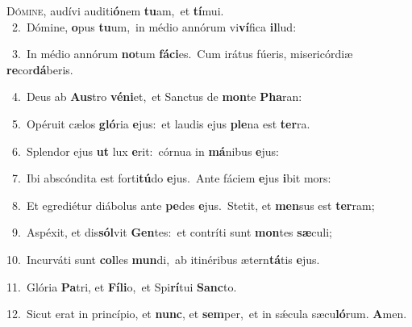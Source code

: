 \lettrine{\initial\textcolor{\initialcolor}{D}}{ómine,} audívi auditi\-\textbf{ó}\-nem \textbf{tu}\-am,~\star et \textbf{tí}\-mui.\\
{\numbfont\textcolor{\numbcolor}{~2.}}~Dómine, \textbf{o}\-pus \textbf{tu}\-um,~\star in médio annórum vi\-\textbf{ví}\-fica \textbf{il}\-lud:\par
{\numbfont\textcolor{\numbcolor}{~3.}}~In médio annórum \textbf{no}\-tum \textbf{fá}\-\textbf{ci}es.~\star Cum irátus fúeris, misericórdiæ \textbf{re}\-cor\-\textbf{dá}\-beris.\par
{\numbfont\textcolor{\numbcolor}{~4.}}~Deus ab \textbf{Aus}\-tro \textbf{vé}\-\textbf{ni}et,~\star et Sanctus de \textbf{mon}\-te \textbf{Pha}\-ran:\par
{\numbfont\textcolor{\numbcolor}{~5.}}~Opéruit cælos \textbf{gló}\-ria \textbf{e}\-jus:~\star et laudis ejus \textbf{ple}\-na est \textbf{ter}\-ra.\par
{\numbfont\textcolor{\numbcolor}{~6.}}~Splendor ejus \textbf{ut} lux \textbf{e}\-rit:~\star córnua in \textbf{má}\-nibus \textbf{e}\-jus:\par
{\numbfont\textcolor{\numbcolor}{~7.}}~Ibi abscóndita est forti\-\textbf{tú}\-do \textbf{e}\-jus.~\star Ante fáciem \textbf{e}\-jus \textbf{i}\-bit mors:\par
{\numbfont\textcolor{\numbcolor}{~8.}}~Et egrediétur diábolus ante \textbf{pe}\-des \textbf{e}\-jus.~\star Stetit, et \textbf{men}\-sus est \textbf{ter}\-ram;\par
{\numbfont\textcolor{\numbcolor}{~9.}}~Aspéxit, et dis\-\textbf{sól}\-vit \textbf{Gen}\-tes:~\star et contríti sunt \textbf{mon}\-tes \textbf{sæ}\-culi;\par
{\numbfont\textcolor{\numbcolor}{10.}}~Incurváti sunt \textbf{col}\-les \textbf{mun}\-di,~\star ab itinéribus ætern\-\textbf{tá}\-tis \textbf{e}\-jus.\par
{\numbfont\textcolor{\numbcolor}{11.}}~Glória \textbf{Pa}\-tri, et \textbf{Fí}\-\textbf{li}o,~\star et Spi\-\textbf{rí}\-tui \textbf{Sanc}\-to.\par
{\numbfont\textcolor{\numbcolor}{12.}}~Sicut erat in princípio, et \textbf{nunc}\-, et \textbf{sem}\-per,~\star et in sǽcula sæcu\-\textbf{ló}\-rum. \textbf{A}\-men.\par
